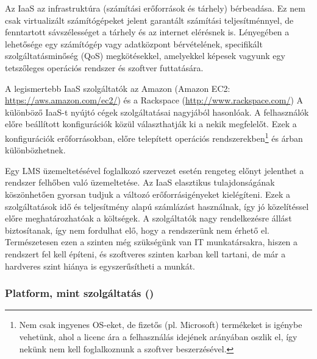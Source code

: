 Az IaaS az infrastruktúra (számítási erőforrások és tárhely) bérbeadása. Ez nem csak virtualizált számítógépeket jelent garantált számítási teljesítménnyel, de fenntartott sávszélességet a tárhely és az internet elérésnek is. Lényegében a lehetősége egy számítógép vagy adatközpont bérvételének, specifikált szolgáltatásminőség (QoS) megkötésekkel, amelyekkel képesek vagyunk egy tetszőleges operációs rendszer és szoftver futtatására.\cite{ccwlinux}

A legismertebb IaaS szolgáltatók az Amazon (Amazon EC2: \href{https://aws.amazon.com/ec2/}{https://aws.amazon.com/ec2/}) és a Rackspace (\href{http://www.rackspace.com/}{http://www.rackspace.com/}) A különböző IaaS-t nyújtó cégek szolgáltatásai nagyjából hasonlóak. A felhasználók előre beállított konfigurációk közül választhatják ki a nekik megfelelőt. Ezek a konfigurációk erőforrásokban, előre telepített operációs rendszerekben\footnote{Nem csak ingyenes OS-eket, de fizetős (pl. Microsoft) termékeket is igénybe vehetünk, ahol a licenc ára a felhasználás idejének arányában oszlik el, így nekünk nem kell foglalkoznunk a szoftver beszerzésével.} és árban különbözhetnek.

Egy LMS üzemeltetésével foglalkozó szervezet esetén rengeteg előnyt jelenthet a rendszer felhőben való üzemeltetése. Az IaaS elasztikus tulajdonságának köszönhetően gyorsan tudjuk a változó erőforrásigényeket kielégíteni. Ezek a szolgáltatások idő és teljesítmény alapú számlázást használnak, így jó közelítéssel előre meghatározhatóak a költségek. A szolgáltatók nagy rendelkezésre állást biztosítanak, így nem fordulhat elő, hogy a rendszerünk nem érhető el. Természetesen ezen a szinten még szükségünk van IT munkatársakra, hiszen a rendszert fel kell építeni, és szoftveres szinten karban kell tartani, de már a hardveres szint hiánya is egyszerűsítheti a munkát.


\subsubsection{Platform, mint szolgáltatás ()}

